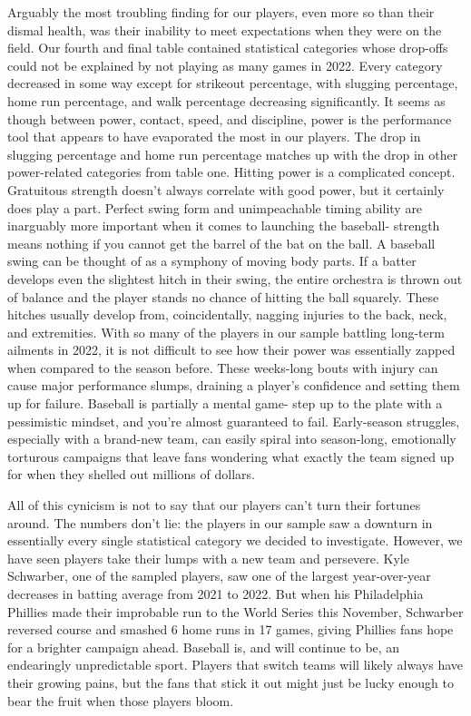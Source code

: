 \documentclass[10pt]{article}
\begin{document}
Arguably the most troubling finding for our players, even more so than their dismal health, was their inability to meet 
expectations when they were on the field. Our fourth and final table contained statistical categories whose drop-offs could 
not be explained by not playing as many games in 2022. Every category decreased in some way except for strikeout percentage, 
with slugging percentage, home run percentage, and walk percentage decreasing significantly. It seems as though between power, 
contact, speed, and discipline, power is the performance tool that appears to have evaporated the most in our players. The drop 
in slugging percentage and home run percentage matches up with the drop in other power-related categories from table one. 
Hitting power is a complicated concept. Gratuitous strength doesn’t always correlate with good power, but it certainly does 
play a part. Perfect swing form and unimpeachable timing ability are inarguably more important when it comes to launching the 
baseball- strength means nothing if you cannot get the barrel of the bat on the ball. A baseball swing can be thought of as a 
symphony of moving body parts. If a batter develops even the slightest hitch in their swing, the entire orchestra is thrown out 
of balance and the player stands no chance of hitting the ball squarely. These hitches usually develop from, coincidentally, 
nagging injuries to the back, neck, and extremities. With so many of the players in our sample battling long-term ailments in 
2022, it is not difficult to see how their power was essentially zapped when compared to the season before. These weeks-long 
bouts with injury can cause major performance slumps, draining a player’s confidence and setting them up for failure. Baseball 
is partially a mental game- step up to the plate with a pessimistic mindset, and you’re almost guaranteed to fail. Early-season 
struggles, especially with a brand-new team, can easily spiral into season-long, emotionally torturous campaigns that leave 
fans wondering what exactly the team signed up for when they shelled out millions of dollars.

All of this cynicism is not to say that our players can’t turn their fortunes around. The numbers don’t lie: the players in 
our sample saw a downturn in essentially every single statistical category we decided to investigate. However, we have seen 
players take their lumps with a new team and persevere. Kyle Schwarber, one of the sampled players, saw one of the largest 
year-over-year decreases in batting average from 2021 to 2022. But when his Philadelphia Phillies made their improbable run 
to the World Series this November, Schwarber reversed course and smashed 6 home runs in 17 games, giving Phillies fans hope for 
a brighter campaign ahead. Baseball is, and will continue to be, an endearingly unpredictable sport. Players that switch teams 
will likely always have their growing pains, but the fans that stick it out might just be lucky enough to bear the fruit when 
those players bloom.
\end{document}
